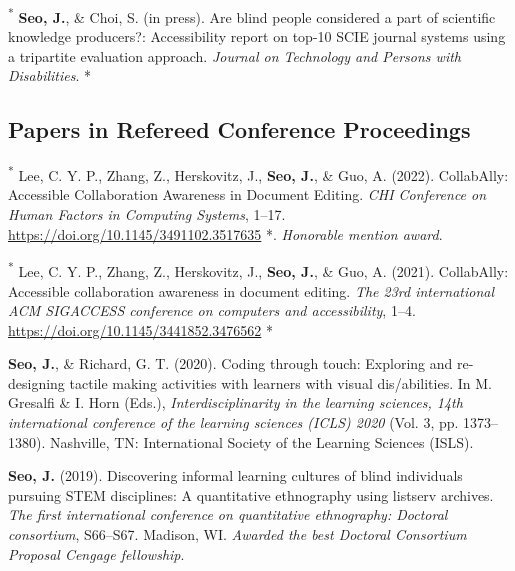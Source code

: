 \documentclass[11pt,a4paper,]{awesome-cv}
\newcommand{\CSLBlock}[1]{#1\hfill\break}
\begin{document}
\leavevmode{}%
\textsuperscript{*} \textbf{Seo, J.}, \& Choi, S. (in press). Are blind
people considered a part of scientific knowledge producers?:
Accessibility report on top-10 SCIE journal systems using a tripartite
evaluation approach. \emph{Journal on Technology and Persons with
Disabilities}.
\CSLBlock{*}

\hypertarget{papers-in-refereed-conference-proceedings}{%
\subsection{Papers in Refereed Conference
Proceedings}\label{papers-in-refereed-conference-proceedings}}

\hypertarget{refs_proceedings}{}
\leavevmode{}%
\textsuperscript{*} Lee, C. Y. P., Zhang, Z., Herskovitz, J.,
\textbf{Seo, J.}, \& Guo, A. (2022). {CollabAlly}: {Accessible
Collaboration Awareness} in {Document Editing}. \emph{{CHI Conference}
on {Human Factors} in {Computing Systems}}, 1--17.
\url{https://doi.org/10.1145/3491102.3517635}
\CSLBlock{*}. \emph{Honorable mention award}.

\leavevmode{}%
\textsuperscript{*} Lee, C. Y. P., Zhang, Z., Herskovitz, J.,
\textbf{Seo, J.}, \& Guo, A. (2021). CollabAlly: Accessible
collaboration awareness in document editing. \emph{The 23rd
international ACM SIGACCESS conference on computers and accessibility},
1--4. \url{https://doi.org/10.1145/3441852.3476562}
\CSLBlock{*}

\leavevmode{}%
\textbf{Seo, J.}, \& Richard, G. T. (2020). Coding through touch:
Exploring and re-designing tactile making activities with learners with
visual dis/abilities. In M. Gresalfi \& I. Horn (Eds.),
\emph{Interdisciplinarity in the learning sciences, 14th international
conference of the learning sciences (ICLS) 2020} (Vol. 3, pp.
1373--1380). Nashville, TN: International Society of the Learning
Sciences (ISLS).

\leavevmode{}%
\textbf{Seo, J.} (2019). Discovering informal learning cultures of blind
individuals pursuing STEM disciplines: A quantitative ethnography using
listserv archives. \emph{The first international conference on
quantitative ethnography: Doctoral consortium}, S66--S67. Madison, WI.
\emph{Awarded the best Doctoral Consortium Proposal Cengage fellowship}.
\end{document}
